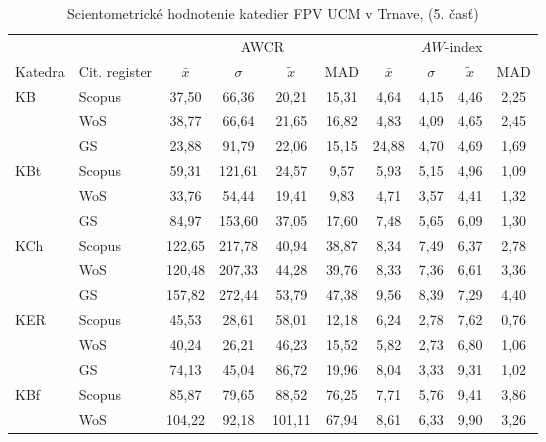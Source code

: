 {\begin{table}
  \centering\small
  \caption[Hodnotenie FPV\,--\,AWCR a $AW$-index]{Scientometrické hodnotenie katedier FPV UCM v Trnave, (5. časť)}
\label{tab:5-staff.results}
\begin{tabularx}{\textwidth}{Xlcccc@{\hspace{3ex}}cccc}
  \toprule\noalign{\vspace{.3ex}}
          &       & \multicolumn{4}{c}{AWCR}         & \multicolumn{4}{c}{$AW$-index}  \\
  Katedra &  Cit. register& $\bar{x}$      & $\sigma$  & $\tilde{x}$ & MAD  & $\bar{x}$      & $\sigma$  & $\tilde{x}$  & MAD  \\[0.3ex]
  \midrule\noalign{\vspace{.5ex}}
 KB   & Scopus & 37,50  & 66,36  & 20,21  & 15,31  & 4,64     & 4,15 & 4,46  & 2,25 \\
      & WoS    & 38,77  & 66,64  & 21,65  & 16,82  & 4,83     & 4,09 & 4,65  & 2,45 \\
      & GS     & 23,88  & 91,79  & 22,06  & 15,15  & 24,88    & 4,70 & 4,69  & 1,69 \\[3ex]
 KBt  & Scopus & 59,31  & 121,61 & 24,57  & 9,57   & 5,93     & 5,15 & 4,96  & 1,09 \\
      & WoS    & 33,76  & 54,44  & 19,41  & 9,83   & 4,71     & 3,57 & 4,41  & 1,32 \\
      & GS     & 84,97  & 153,60 & 37,05  & 17,60  & 7,48     & 5,65 & 6,09  & 1,30 \\[3ex]
 KCh  & Scopus & 122,65 & 217,78 & 40,94  & 38,87  & 8,34     & 7,49 & 6,37  & 2,78 \\
      & WoS    & 120,48 & 207,33 & 44,28  & 39,76  & 8,33     & 7,36 & 6,61  & 3,36 \\
      & GS     & 157,82 & 272,44 & 53,79  & 47,38  & 9,56     & 8,39 & 7,29  & 4,40 \\[3ex]
 KER  & Scopus & 45,53  & 28,61  & 58,01  & 12,18  & 6,24     & 2,78 & 7,62  & 0,76 \\
      & WoS    & 40,24  & 26,21  & 46,23  & 15,52  & 5,82     & 2,73 & 6,80  & 1,06 \\
      & GS     & 74,13  & 45,04  & 86,72  & 19,96  & 8,04     & 3,33 & 9,31  & 1,02 \\[3ex]
 KBf  & Scopus & 85,87  & 79,65  & 88,52  & 76,25  & 7,71     & 5,76 & 9,41  & 3,86 \\
      & WoS    & 104,22 & 92,18  & 101,11 & 67,94  & 8,61     & 6,33 & 9,90  & 3,26 \\

\end{tabularx}
\end{table}}
